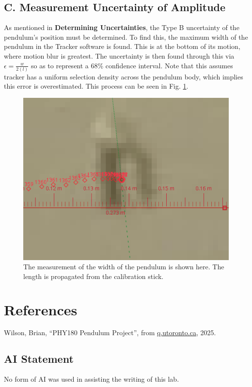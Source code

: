 \documentclass[prl,twocolumn,amsmath,amssymb,superscriptaddress]{revtex4-2}
\begin{document}
\subsection{C. Measurement Uncertainty of Amplitude}

As mentioned in \textbf{Determining Uncertainties}, the Type B uncertainty of the pendulum's position must be determined. To find this, the maximum width of the pendulum in the Tracker software is found. This is at the bottom of its motion, where motion blur is greatest. The uncertainty is then found through this via $\epsilon = \frac{w}{2(l)}$ so as to represent a 68\% confidence interval. Note that this assumes tracker has a uniform selection density across the pendulum body, which implies this error is overestimated. This process can be seen in Fig. \ref{fig:body}.
\begin{figure}[htb]
    \includegraphics[width=0.2\linewidth]{pendulum-body.png}
    \caption{The measurement of the width of the pendulum is shown here. The length is propagated from the calibration stick.}
    \label{fig:body}
\end{figure}

\newpage

\section{References}

Wilson, Brian, “PHY180 Pendulum Project”, from
\href{https://q.utoronto.ca/courses/411727/files/39071655?module_item_id=7122439}{q.utoronto.ca}, 2025.


\subsection{AI Statement}

No form of AI was used in assisting the writing of this lab.
\end{document}
